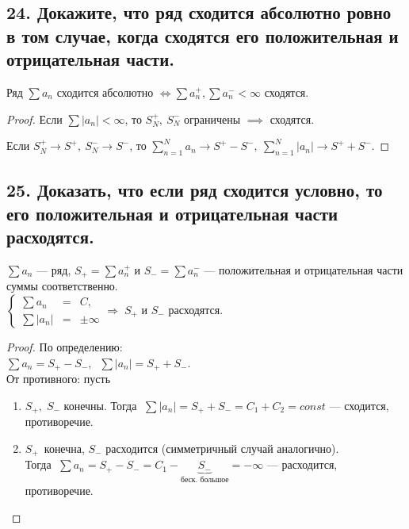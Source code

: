 \documentclass[a4paper, fleqn]{article}
\begin{document}
    \subsection*{24. Докажите, что ряд сходится абсолютно ровно в том случае, когда сходятся его положительная и отрицательная части.}
    \begin{proposition}
        Ряд $\sum a_n$ сходится абсолютно $\iff \sum a_n^+, \sum a_n^- < \infty$ сходятся. 
    \end{proposition}
    \begin{proof}
        Если $\sum \left|a_n\right| < \infty$, то $S_N^+,\ S_N^-$ ограничены $\implies$ сходятся.

        Если $S_N^+ \to S^+,\ S_N^- \to S^-$, то $\sum_{n=1}^N a_n \to S^+ - S^-,\ \sum_{n=1}^N \left|a_n\right| \to S^+ + S^-$.
    \end{proof}
        
    \subsection*{25. Доказать, что если ряд сходится условно, то его положительная и отрицательная части расходятся.}
	$\sum a_n$ --- ряд, $S_{+} = \sum a_n^{+}$ и $S_{-} = \sum a_n^{-}$
	 --- положительная и отрицательная части суммы соответственно. \\[3 pt]
	 $\left\{\begin{array}{lll} 
	 \sum a_n &=& C,\\[5 pt]
	 \sum |a_n| &=& \pm \infty
	 \end{array}\right. \Rightarrow \; S_{+}$ и $S_{-}$ расходятся.
	\begin{proof}
	По определению: \\[3 pt]
	$\sum a_n = S_{+} - S_{-}, \;\; \sum |a_n| = S_{+} + S_{-}$. \\[3 pt]
	От противного: пусть\\[-20 pt]
	\begin{enumerate}
	\item $S_{+}, \; S_{-}$ конечны. Тогда $\;\sum |a_n| = S_{+} + S_{-} = C_1 + C_2 = const$ --- сходится, противоречие.
	\item $S_{+} \, $ конечна, $S_{-}$ расходится (симметричный случай аналогично). \\[0 pt]
	Тогда $\; \sum a_n = S_{+} - S_{-} = C_1 - \underbrace{S_{-}}_{\text{беск. большое}} = -\infty$ --- расходится, противоречие.
	\end{enumerate}
	\end{proof}    
\end{document}
